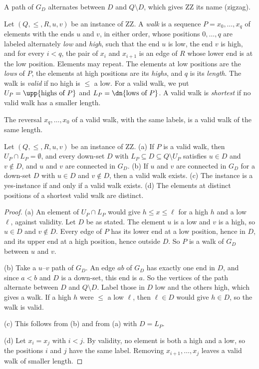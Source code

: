 A path of $G_D$ alternates between $D$ and $Q \setminus D$, which gives ZZ its name (zigzag).

\begin{definition}
\label{def:zz-valid}
Let $(Q, \leq, R, u, v)$ be an instance of ZZ.
A \emph{walk} is a sequence $P = x_0, \dots, x_q$ of elements with the ends $u$ and $v$, in either order, whose positions $0, \dots, q$ are labeled alternately \emph{low} and \emph{high}, such that the end $u$ is low, the end $v$ is high, and for every $i < q$, the pair of $x_i$ and $x_{i+1}$ is an edge of $R$ whose lower end is at the low position.
Elements may repeat.
The elements at low positions are the \emph{lows} of $P$, the elements at high positions are its \emph{highs}, and $q$ is its \emph{length}.
The walk is \emph{valid} if no high is $\leq$ a low.
For a valid walk, we put $U_P = \upp \{\text{highs of } P\}$ and $L_P = \dn \{\text{lows of } P\}$.
A valid walk is \emph{shortest} if no valid walk has a smaller length.
\end{definition}

The reversal $x_q, \dots, x_0$ of a valid walk, with the same labels, is a valid walk of the same length.

\begin{lemma}
\label{lem:zz-valid}
Let $(Q, \leq, R, u, v)$ be an instance of ZZ.
(a) If $P$ is a valid walk, then $U_P \cap L_P = \emptyset$, and every down-set $D$ with $L_P \subseteq D \subseteq Q \setminus U_P$ satisfies $u \in D$ and $v \notin D$, and $u$ and $v$ are connected in $G_D$.
(b) If $u$ and $v$ are connected in $G_D$ for a down-set $D$ with $u \in D$ and $v \notin D$, then a valid walk exists.
(c) The instance is a yes-instance if and only if a valid walk exists.
(d) The elements at distinct positions of a shortest valid walk are distinct.
\end{lemma}

\begin{proof}
(a) An element of $U_P \cap L_P$ would give $h \leq x \leq \ell$ for a high $h$ and a low $\ell$, against validity.
Let $D$ be as stated.
The element $u$ is a low and $v$ is a high, so $u \in D$ and $v \notin D$.
Every edge of $P$ has its lower end at a low position, hence in $D$, and its upper end at a high position, hence outside $D$.
So $P$ is a walk of $G_D$ between $u$ and $v$.

(b) Take a $u$--$v$ path of $G_D$.
An edge $ab$ of $G_D$ has exactly one end in $D$, and since $a < b$ and $D$ is a down-set, this end is $a$.
So the vertices of the path alternate between $D$ and $Q \setminus D$.
Label those in $D$ low and the others high, which gives a walk.
If a high $h$ were $\leq$ a low $\ell$, then $\ell \in D$ would give $h \in D$, so the walk is valid.

(c) This follows from (b) and from (a) with $D = L_P$.

(d) Let $x_i = x_j$ with $i < j$.
By validity, no element is both a high and a low, so the positions $i$ and $j$ have the same label.
Removing $x_{i+1}, \dots, x_j$ leaves a valid walk of smaller length.
\end{proof}

